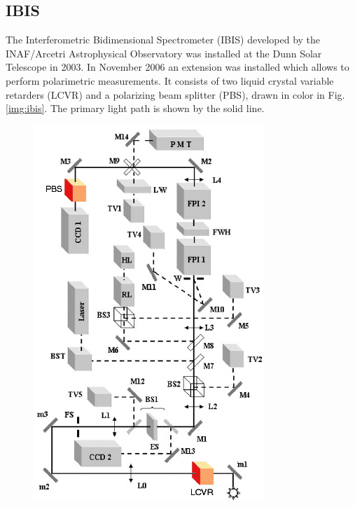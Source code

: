 \documentclass[a4paper,11pt]{article}
\begin{document}
\subsection{IBIS}
The Interferometric Bidimensional Spectrometer (IBIS) developed by the INAF/Arcetri Astrophysical Observatory was installed at the Dunn Solar Telescope in 2003. In November 2006 an extension was installed which allows to perform polarimetric measurements. It consists of two liquid crystal variable retarders (LCVR) and a polarizing beam splitter (PBS), drawn in color in Fig.\ref{img:ibis}. The primary light path is shown by the solid line.\par
\vspace{-2pt}
\begin{figure}[h!]
\begin{minipage}[t]{0.55\textwidth}
\vspace{0pt}
\centering
\includegraphics[width=\textwidth]{ibis.jpg}

\end{minipage}
\end{figure}
\end{document}
